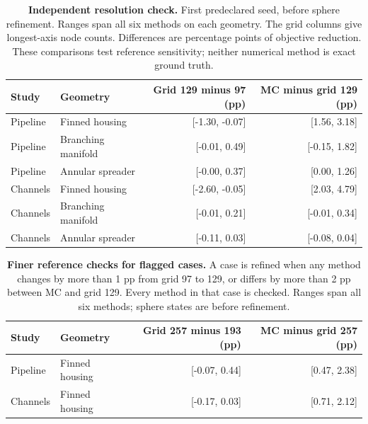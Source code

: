 \begin{table}[t]
\centering\small
\caption{\textbf{Independent resolution check.} First predeclared seed, before sphere refinement. Ranges span all six methods on each geometry. The grid columns give longest-axis node counts. Differences are percentage points of objective reduction. These comparisons test reference sensitivity; neither numerical method is exact ground truth.}
\label{tab:submissionreference}
\begin{tabular}{llrr}
\toprule
Study & Geometry & Grid 129 minus 97 (pp) & MC minus grid 129 (pp) \\
\midrule
Pipeline & Finned housing & [-1.30, -0.07] & [1.56, 3.18] \\
Pipeline & Branching manifold & [-0.01, 0.49] & [-0.15, 1.82] \\
Pipeline & Annular spreader & [-0.00, 0.37] & [0.00, 1.26] \\
Channels & Finned housing & [-2.60, -0.05] & [2.03, 4.79] \\
Channels & Branching manifold & [-0.01, 0.21] & [-0.01, 0.34] \\
Channels & Annular spreader & [-0.11, 0.03] & [-0.08, 0.04] \\
\bottomrule
\end{tabular}
\end{table}
\begin{table}[t]
\centering\small
\caption{\textbf{Finer reference checks for flagged cases.} A case is refined when any method changes by more than 1 pp from grid 97 to 129, or differs by more than 2 pp between MC and grid 129. Every method in that case is checked. Ranges span all six methods; sphere states are before refinement.}
\label{tab:submissionfinereference}
\begin{tabular}{llrr}
\toprule
Study & Geometry & Grid 257 minus 193 (pp) & MC minus grid 257 (pp) \\
\midrule
Pipeline & Finned housing & [-0.07, 0.44] & [0.47, 2.38] \\
Channels & Finned housing & [-0.17, 0.03] & [0.71, 2.12] \\
\bottomrule
\end{tabular}
\end{table}
